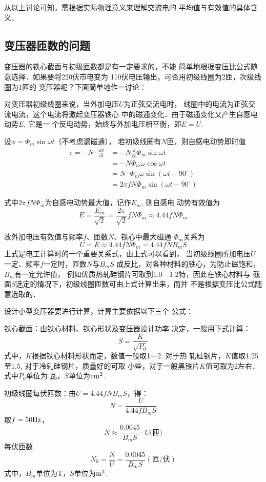 从以上讨论可知，需根据实际物理意义来理解交流电的
平均值与有效值的具体含义．

\subsection{变压器匝数的问题}
变压器的铁心截面与初级匝数都是有一定要求的，不能
简单地根据变压比公式随意选择．如果要将220伏市电变为
110伏电压输出，可否用初级线圈为2匝，次级线圈为1匝的
变压器呢？下面简单地作一讨论：

对变压器初级线圈来说，当外加电压$U$为正弦交流电时，
线圈中的电流为正弦交流电流，这个电流将激起变压器铁心
中的磁通变化．由于磁通变化又产生自感电动势$E$, 它是一
个反电动势，始终与外加电压相平衡，即$E=U$.

设$\phi=\Phi_m\sin\omega t$（不考虑漏磁通），
若初级线圈有$N$匝，则自感电动势即时值
\[\begin{split}
    e=-N\cdot \frac{\dd\phi}{\dd t}&=-N\frac{\dd}{\dd t}\Phi_m\sin\omega t\\
&=-N\Phi_m\omega \cos\omega t\\
&=N\cdot \Phi_m\omega \sin(\omega t-90^{\circ})\\
&=2\pi f N \Phi_m \sin(\omega t-90^{\circ})
\end{split}\]

式中$2\pi f N \Phi_m$为自感电动势最大值，记作$E_m$, 则自感电
动势有效值为
\[E=\frac{E_m}{\sqrt{2}}=\frac{2\pi}{\sqrt{2}}f N \Phi_m\approx 4.44 f N \Phi_m\]

故外加电压有效值与频率$f$、匝数$N$、铁心中最大磁通
$\Phi_m$关系为
\[U=E\approx 4.44fN\Phi_m=4.44fNB_mS\]
上式是电工计算时的一个重要关系式，由上式可以看到，
当初级线圈所加电压$U$一定、频率$f$一定时，匝数$N$与$B_mS$
成反比，对各种材料的铁心，为防止磁饱和，$B_m$有一定允许值，
例如优质热轧硅钢片可取到1.0—1.2特，因此在铁心材料与
截面$S$选定的情况下，初级线圈匝数可由上式计算出来，而并
不是根据变压比公式随意选取的．

设计小型变压器要进行计算，计算主要依据以下三个
公式：

铁心截面：由铁心材料、铁心形状及变压器设计功率
决定，一般用下式计算：
\[S=\frac{K}{\sqrt{P_0}}\]
式中，$K$根据铁心材料形状而定，数值一般取1—2. 对于热
轧硅钢片，$K$值取1.25至1.5, 对于冷轧硅钢片，质量好的可取
小些，对于一般黑铁片$K$值可取为2左右．式中$P_0$单位为
瓦，$S$单位为${\rm cm^2}$.

初级线圈每伏匝数：由$U=4.44fNB_mS$，得：
\[N=\frac{U}{4.44fB_mS}\]
取$f=50{\rm Hz}$，
\[N\approx \frac{0.0045}{B_mS}\cdot U \text{(匝)}\]
每伏匝数
\[N_0=\frac{N}{U}=\frac{0.0045}{B_mS}(\text{匝/伏})\]
式中，$B_m$单位为T，$S$单位为${\rm m^2}$.

